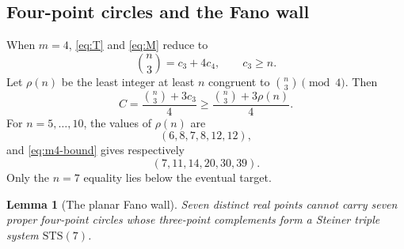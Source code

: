 \documentclass[11pt]{article}
\newtheorem{lemma}[theorem]{Lemma}
\theoremstyle{definition}
\theoremstyle{remark}
\begin{document}
\subsection{Four-point circles and the Fano wall}

When \(m=4\), \eqref{eq:T} and \eqref{eq:M} reduce to
\begin{equation}\label{eq:m4}
 \binom n3=c_3+4c_4,\qquad c_3\geq n.
\end{equation}
Let \(\rho(n)\) be the least integer at least \(n\) congruent to
\(\binom n3\pmod4\).  Then
\begin{equation}\label{eq:m4-bound}
 C=\frac{\binom n3+3c_3}{4}
 \geq\frac{\binom n3+3\rho(n)}4.
\end{equation}
For \(n=5,\ldots,10\), the values of \(\rho(n)\) are
\[
 (6,8,7,8,12,12),
\]
and \eqref{eq:m4-bound} gives respectively
\begin{equation}\label{eq:m4-values}
 (7,11,14,20,30,39).
\end{equation}
Only the \(n=7\) equality lies below the eventual target.

\begin{lemma}[The planar Fano wall]\label{lem:fano}
Seven distinct real points cannot carry seven proper four-point circles
whose three-point complements form a Steiner triple system \(\mathrm{STS}(7)\).
\end{lemma}
\end{document}
